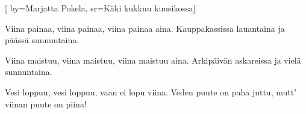 [
	by={Marjatta Pokela},
		sr={Käki kukkuu kuusikossa}]

\beginverse
Viina painaa, viina painaa,
viina painaa aina.
Kauppakassissa lauantaina
ja päässä sunnuntaina.
\endverse

\beginverse
Viina maistuu, viina maistuu,
viina maistuu aina.
Arkipäivän askareissa
ja vielä sunnuntaina.
\endverse

\beginverse
Vesi loppuu, vesi loppuu,
vaan ei lopu viina.
Veden puute on paha juttu,
mutt' viinan puute on piina!
\endverse
\endsong